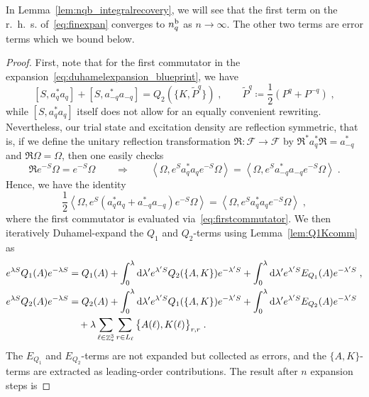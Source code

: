\documentclass[12pt,a4paper]{article}
\numberwithin{equation}{section}
\newcommand{\cF}{\mathcal{F}}
\newcommand{\fR}{\mathfrak{R}}
\newcommand{\1}{\mathbb{I}}
\renewcommand{\b}{\textnormal{b}}
\newcommand{\di}{\textnormal{d}}
\DeclareMathOperator{\Z}{\mathbb{Z}}
\newcommand{\half}{\frac{1}{2}}
\newcommand{\eva}[1]{\left\langle #1 \right\rangle}
\theoremstyle{plain}
\theoremstyle{definition}
\theoremstyle{remark}
\theoremstyle{plain}
\theoremstyle{definition}
\theoremstyle{remark}
\begin{document}
In Lemma~\ref{lem:nqb_integralrecovery}, we will see that the first term on the r.~h.~s. of~\eqref{eq:finexpan} converges to $ n_q^{\b} $ as $ n \to \infty $. The other two terms are error terms which we bound below.


\begin{proof}
First, note that for the first commutator in the expansion~\eqref{eq:duhamelexpansion_blueprint}, we have
\begin{equation} \label{eq:firstcommutator}
	[S, a_q^* a_q] + [S, a_{-q}^* a_{-q}]
	= Q_2(\{K,\tilde{P}^q\}) \;, \qquad
	\tilde{P}^q \coloneq \half(P^q + P^{-q}) \;,
\end{equation}
while $ [S, a_q^* a_q] $ itself does not allow for an equally convenient rewriting. Nevertheless, our trial state and excitation density are reflection symmetric, that is, if we define the unitary reflection transformation $ \fR: \cF \to \cF $ by $ \fR^* a_q^* \fR = a^*_{-q} $ and $ \fR \Omega = \Omega $, then one easily checks
\begin{equation} \label{eq:reflectionsymmetry}
	\fR e^{-S} \Omega = e^{-S} \Omega \qquad \Rightarrow \qquad
	\eva{\Omega, e^{S} a^*_q a_q e^{-S}\Omega} = \eva{\Omega, e^{S} a^*_{-q} a_{-q} e^{-S} \Omega} \;.
\end{equation}
Hence, we have the identity
\begin{equation}
	\half \eva{\Omega, e^{S} (a_q^* a_q + a_{-q}^* a_{-q}) e^{-S} \Omega} 
	= \eva{\Omega, e^{S} a_q^* a_q e^{-S} \Omega} \;,
\end{equation}
where the first commutator is evaluated via~\eqref{eq:firstcommutator}. We then iteratively Duhamel-expand the $ Q_1 $ and $ Q_2 $-terms using Lemma~\ref{lem:Q1Kcomm} as
\begin{equation}
\begin{aligned}
	e^{\lambda S} Q_1(A) e^{-\lambda S}
	&= Q_1(A) + \int_0^{\lambda} \di \lambda' e^{\lambda' S} Q_2(\{A,K\}) e^{-\lambda' S}
		+ \int_0^{\lambda} \di \lambda' e^{\lambda' S} E_{Q_1}(A) e^{-\lambda' S} \;, \\
	e^{\lambda S} Q_2(A) e^{-\lambda S}
	&= Q_2(A) + \int_0^{\lambda} \di \lambda' e^{\lambda' S} Q_1(\{A,K\}) e^{-\lambda' S}
		+ \int_0^{\lambda} \di \lambda' e^{\lambda' S} E_{Q_2}(A) e^{-\lambda' S} \\
	&\quad + \lambda \sum\limits_{\ell \in \Z^3_*} \sum\limits_{r \in L_{\ell}} \big\{ A(\ell), K(\ell) \big\}_{r,r} \;.
\end{aligned}
\end{equation}
The $ E_{Q_1} $ and $ E_{Q_2} $-terms are not expanded but collected as errors, and the $ \{A,K\} $-terms are extracted as leading-order contributions. The result after $ n $ expansion steps is

\end{proof}
\end{document}
